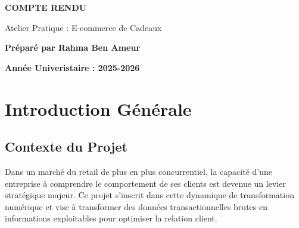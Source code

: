 \documentclass[11pt,a4paper]{article}
\begin{document}
\begin{titlepage}

\vspace{6cm}

\begin{center}
{\LARGE\textbf{COMPTE RENDU}}\par
\vspace{1cm}
{\large Atelier Pratique : E-commerce de Cadeaux}\par
\vspace{2cm}
{\large \textbf{Préparé par Rahma Ben Ameur}}
\vspace{3cm}


\vspace{2cm}



\vspace{5cm}

{\textbf{Année Univeristaire : 2025-2026}}

\end{center}
\vfill
\end{titlepage}


\newpage
\thispagestyle{empty}
\renewcommand{\contentsname}{\color{headerblue}Table des Matières} %
\tableofcontents
\newpage
\setcounter{page}{1}
\section{Introduction Générale}

\subsection{Contexte du Projet}
Dans un marché du retail de plus en plus concurrentiel, la capacité d'une entreprise à comprendre le comportement de ses clients est devenue un levier stratégique majeur. Ce projet s'inscrit dans cette dynamique de transformation numérique et vise à transformer des données transactionnelles brutes en informations exploitables pour optimiser la relation client.
\end{document}

